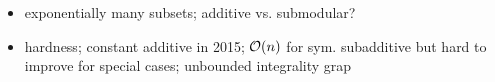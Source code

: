 \begin{itemize}
%
%
%
%

	\item
	exponentially many subsets;
	additive vs. submodular?

	\item
	hardness; constant additive in 2015; \(\mathcal{O}(n)\) for sym. subadditive but hard to improve for special cases; unbounded integrality grap \cite{approximating_nsw_under_rado_valuations}
\end{itemize}